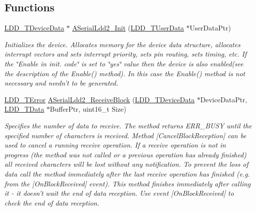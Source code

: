 \subsection*{Functions}
\begin{DoxyCompactItemize}
\item 
\hyperlink{group___p_e___types__module_gac5cf1362f1f0e3a2ce71b1bf2276d091}{L\-D\-D\-\_\-\-T\-Device\-Data} $\ast$ \hyperlink{group___a_serial_ldd2__module_gaa0cd7e49c9c5deb19ce7f9ece16231c3}{A\-Serial\-Ldd2\-\_\-\-Init} (\hyperlink{group___p_e___types__module_ga0b66a73f87238a782318aa0be7578e35}{L\-D\-D\-\_\-\-T\-User\-Data} $\ast$User\-Data\-Ptr)
\begin{DoxyCompactList}\small\item\em Initializes the device. Allocates memory for the device data structure, allocates interrupt vectors and sets interrupt priority, sets pin routing, sets timing, etc. If the \char`\"{}\-Enable
    in init. code\char`\"{} is set to \char`\"{}yes\char`\"{} value then the device is also enabled(see the description of the Enable() method). In this case the Enable() method is not necessary and needn't to be generated. \end{DoxyCompactList}\item 
\hyperlink{group___p_e___types__module_ga24c2b045fd04e79e85f261ce4df35588}{L\-D\-D\-\_\-\-T\-Error} \hyperlink{group___a_serial_ldd2__module_gaf41a4ccffe5f5791cbc9b6e6e912962d}{A\-Serial\-Ldd2\-\_\-\-Receive\-Block} (\hyperlink{group___p_e___types__module_gac5cf1362f1f0e3a2ce71b1bf2276d091}{L\-D\-D\-\_\-\-T\-Device\-Data} $\ast$Device\-Data\-Ptr, \hyperlink{group___p_e___types__module_gade8ef9401405bd941b6da738b807f980}{L\-D\-D\-\_\-\-T\-Data} $\ast$Buffer\-Ptr, uint16\-\_\-t Size)
\begin{DoxyCompactList}\small\item\em Specifies the number of data to receive. The method returns E\-R\-R\-\_\-\-B\-U\-S\-Y until the specified number of characters is received. Method \mbox{[}Cancel\-Block\-Reception\mbox{]} can be used to cancel a running receive operation. If a receive operation is not in progress (the method was not called or a previous operation has already finished) all received characters will be lost without any notification. To prevent the loss of data call the method immediately after the last receive operation has finished (e.\-g. from the \mbox{[}On\-Block\-Received\mbox{]} event). This method finishes immediately after calling it -\/ it doesn't wait the end of data reception. Use event \mbox{[}On\-Block\-Received\mbox{]} to check the end of data reception. \end{DoxyCompactList}\item 

\end{DoxyCompactItemize}

